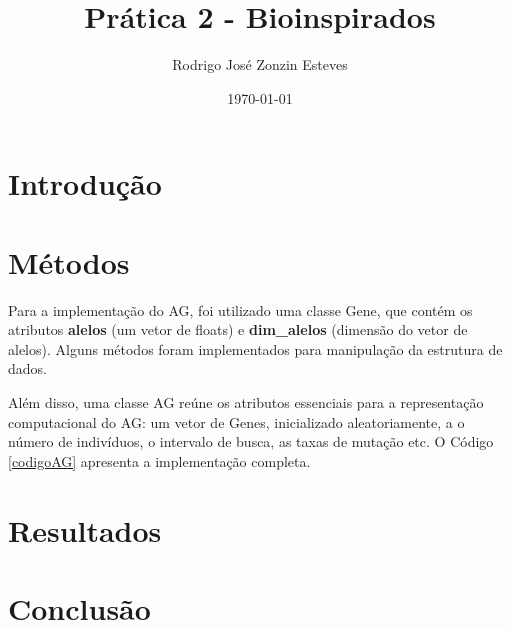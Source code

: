 \documentclass[12pt]{article}
\title{Prática 2 - Bioinspirados}
\author{Rodrigo José Zonzin Esteves}
\date{\today}
\begin{document}
\maketitle

\section{Introdução}

\section{Métodos}
Para a implementação do AG, foi utilizado uma classe Gene, que contém os atributos \textbf{alelos} (um vetor de floats) e \textbf{dim\_alelos} (dimensão do vetor de alelos). Alguns métodos foram implementados para manipulação da estrutura de dados. 

Além disso, uma classe AG reúne os atributos essenciais para a representação computacional do AG: um vetor de Genes, inicializado aleatoriamente, a o número de indivíduos, o intervalo de busca, as taxas de mutação etc. O Código \ref{codigoAG} apresenta a implementação completa. 

\section{Resultados}

\section{Conclusão}
\end{document}
